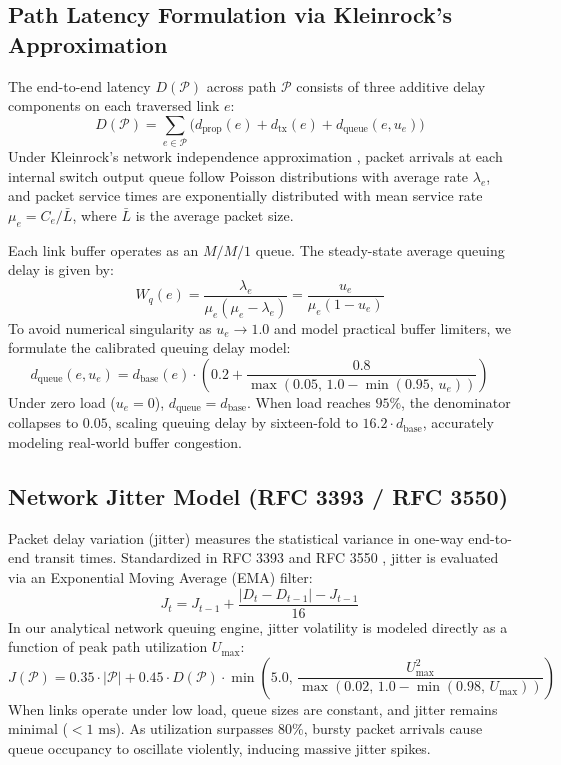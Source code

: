 \subsection{Path Latency Formulation via Kleinrock's Approximation}
The end-to-end latency $D(\mathcal{P})$ across path $\mathcal{P}$ consists of three additive delay components on each traversed link $e$:
\begin{equation}
    D(\mathcal{P}) = \sum_{e \in \mathcal{P}} \Big( d_{\text{prop}}(e) + d_{\text{tx}}(e) + d_{\text{queue}}(e, u_e) \Big)
\end{equation}
Under Kleinrock's network independence approximation \cite{kleinrock1964communication}, packet arrivals at each internal switch output queue follow Poisson distributions with average rate $\lambda_e$, and packet service times are exponentially distributed with mean service rate $\mu_e = C_e / \bar{L}$, where $\bar{L}$ is the average packet size.

Each link buffer operates as an $M/M/1$ queue. The steady-state average queuing delay is given by:
\begin{equation}
    W_q(e) = \frac{\lambda_e}{\mu_e(\mu_e - \lambda_e)} = \frac{u_e}{\mu_e(1 - u_e)}
\end{equation}
To avoid numerical singularity as $u_e \to 1.0$ and model practical buffer limiters, we formulate the calibrated queuing delay model:
\begin{equation}
    d_{\text{queue}}(e, u_e) = d_{\text{base}}(e) \cdot \left( 0.2 + \frac{0.8}{\max\left(0.05, \, 1.0 - \min(0.95, \, u_e)\right)} \right)
    \label{eq:queuing_delay_formula}
\end{equation}
Under zero load ($u_e = 0$), $d_{\text{queue}} = d_{\text{base}}$. When load reaches $95\%$, the denominator collapses to $0.05$, scaling queuing delay by sixteen-fold to $16.2 \cdot d_{\text{base}}$, accurately modeling real-world buffer congestion.

\subsection{Network Jitter Model (RFC 3393 / RFC 3550)}
Packet delay variation (jitter) measures the statistical variance in one-way end-to-end transit times. Standardized in RFC 3393 \cite{deroo2002ip} and RFC 3550 \cite{schulzrinne2003rtp}, jitter is evaluated via an Exponential Moving Average (EMA) filter:
\begin{equation}
    J_t = J_{t-1} + \frac{|D_t - D_{t-1}| - J_{t-1}}{16}
\end{equation}
In our analytical network queuing engine, jitter volatility is modeled directly as a function of peak path utilization $U_{\max}$:
\begin{equation}
    J(\mathcal{P}) = 0.35 \cdot |\mathcal{P}| + 0.45 \cdot D(\mathcal{P}) \cdot \min\left(5.0, \, \frac{U_{\max}^2}{\max(0.02, \, 1.0 - \min(0.98, \, U_{\max}))}\right)
    \label{eq:jitter_analytical_model}
\end{equation}
When links operate under low load, queue sizes are constant, and jitter remains minimal ($< 1\text{ ms}$). As utilization surpasses $80\%$, bursty packet arrivals cause queue occupancy to oscillate violently, inducing massive jitter spikes.

